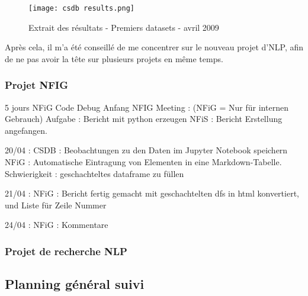 \begin{figure}[H]
    \centering
    \texttt{[image: csdb results.png]}
    \caption{Extrait des résultats - Premiers datasets - avril 2009}
\end{figure}

Après cela, il m'a été conseillé de me concentrer sur le nouveau projet d'NLP, afin de ne pas avoir la tête sur plusieurs projets en même temps.

\pagebreak

\subsubsection{Projet NFIG}

5 jours
NFiG Code Debug Anfang
NFIG Meeting : (NFiG = Nur für internen Gebrauch)
Aufgabe : Bericht mit python erzeugen
NFiS : Bericht Erstellung angefangen. 

20/04 : 
CSDB : Beobachtungen zu den Daten im Jupyter Notebook speichern
NFiG : Automatische Eintragung von Elementen in eine Markdown-Tabelle. Schwierigkeit : geschachteltes dataframe zu füllen

21/04 : 
NFiG : Bericht fertig gemacht mit geschachtelten dfs in html konvertiert, und Liste für Zeile Nummer

24/04 : 
NFiG : Kommentare


\subsubsection{Projet de recherche NLP}

\subsection{Planning général suivi}